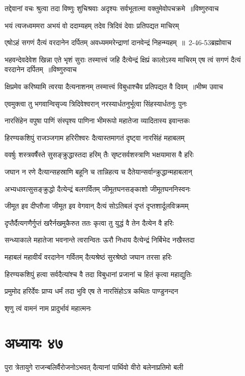 \twolineshloka
{तद्देवानां वचः श्रुत्वा तदा विष्णुः शुचिश्रवाः}
{अदृश्यः सर्वभूतात्मा वक्तुमेवोपचक्रमे ॥विष्णुरुवाच}


\twolineshloka
{भयं त्यजध्वममरा अभयं वो ददाम्यहम्}
{तदेव त्रिदिवं देवाः प्रतिपद्यत माचिरम्}


\twolineshloka
{एषोऽहं सगणं दैत्यं वरदानेन दर्पितम्}
{अवध्यममरेन्द्राणां दानवेन्द्रं निहन्म्यहम् ॥ 2-46-53ब्रह्मोवाच}


\threelineshloka
{भहवन्देवदेवेश खिन्ना एते भृशं सुराः}
{तस्मात्त्वं जहि दैत्येन्द्रं क्षिप्रं कालोऽस्य माचिरम्}
{एष त्वं सगणं दैत्यं वरदानेन दर्पितम् ॥विष्णुरुवाच}


\twolineshloka
{क्षिप्रमेव करिष्यामि त्वरया दैत्यनाशनम्}
{तस्मात्त्वं विबुधाश्चैव प्रतिपद्यत वै दिवम् ॥भीष्म उवाच}


\twolineshloka
{एवमुक्त्वा तु भगवान्विसृज्य त्रिदिवेश्वरान्}
{नरस्यार्धतनुर्भूत्वा सिंहस्यार्धतनुः पुनः}


\twolineshloka
{नारसिंहेन वपुषा पाणिं संस्पृश्य पाणिना}
{भीमरूपो महातेजा व्यादितास्य इवान्तकः}


\twolineshloka
{हिरण्यकशिपुं राजञ्जगाम हरिरीश्वरः}
{दैत्यास्तमागतं दृष्ट्वा नारसिंहं महाबलम्}


\twolineshloka
{ववर्षुः शस्त्रवर्षैस्ते सुसङ्क्रुद्धास्तदा हरिम्}
{तैः सृष्टसर्वशस्त्राणि भक्षयामास वै हरिः}


\twolineshloka
{जघान न रणे दैत्यान्सहस्राणि बहूनि च}
{तान्निहत्य च दैतेयान्सर्वान्क्रुद्धान्महाबलान्}


\twolineshloka
{अभ्यधावत्सुसङ्क्रुद्धो दैत्येन्द्रं बलगर्वितम्}
{जीमूतघनसङ्काशो जीमूतघननिस्वनः}


\twolineshloka
{जीमूत इव दीप्तौजा जीमूत इव वेगवान्}
{दैत्यं सोऽतिबलं दृप्तं दृप्तशार्दूलविक्रमम्}


\twolineshloka
{दृप्तैर्दैत्यगणैर्गुप्तं खरैर्नखमुकैरुत}
{ततः कृत्वा तु युद्धं वै तेन दैत्येन वै हरिः}


\twolineshloka
{सन्ध्याकाले महातेजा भवनान्ते त्वरान्वितः}
{ऊरौ निधाय दैत्येन्द्रं निर्बिभेद नखैस्तदा}


\twolineshloka
{महाबलं महावीर्यं वरदानेन गर्वितम्}
{दैत्यश्रेष्ठं सुरश्रेष्ठो जघान तरसा हरिः}


\twolineshloka
{हिरण्यकशिपुं हत्वा सर्वदैत्यांश्च वै तदा}
{विबुधानां प्रजानां च हितं कृत्वा महाद्युतिः}


\threelineshloka
{प्रमुमोद हरिर्देवः प्राप्य धर्मं तदा भुवि}
{एष ते नारसिंहोऽत्र कथितः पाण्डुनन्दन}
{}


शृणु त्वं वामनं नाम प्रादुर्भावं महात्मनः
\chapter{अध्यायः ४७}
\twolineshloka
{पुरा त्रेतायुगे राजन्बलिर्वैरोजनोऽभवत्}
{दैत्यानां पार्थिवो वीरो बलेनाप्रतिमो बली}


